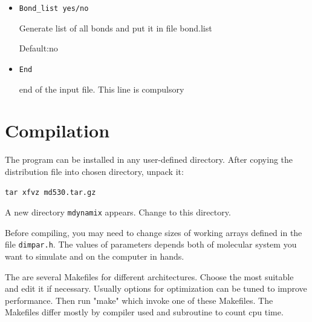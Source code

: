 \documentclass{article}
\begin{document}
\begin{itemize}
\verb|ascvel|  - ACSII (XMOL-type format) with coordinates and velocities

\verb|ascfor|  - ACSII (XMOL-type format) with coordinates and forces (in kJ/mol/\AA )

\verb|ascfvl|  - ACSII (XMOL-format) with coordinates, velocities and forces

\verb|<step>| is time interval (in femtoseconds) between the configurations 
saved in the trajectory file

\verb|<num_conf>| - number of configurations in each trajectory file. 
After filling \verb|<num_conf>| configuration in a trajectory file, 
the program begins to write configurations in the next file. 
Trajectory files acquire extensions .001, .002, .003, etc   

\verb|<list>| - list (in the form of numbers 0 or 1 for each molecule type) 
which signals whether to include molecules of this type into trajectory.
\verb|<list>| may be set also to ``all'' (all molecules)   

Units for velocities in the trajectory file are \AA/fs.

\item
\verb|Bond_list yes/no|

Generate list of all bonds and put it in file bond.list

Default:no

\item
\verb|End|    

end of the input file. This line is compulsory

\end{itemize}


\section{Compilation}

The program can be installed in any user-defined directory. After
copying the distribution file into chosen directory, unpack it:

\verb|tar xfvz md530.tar.gz|

A new directory \verb|mdynamix| appears. Change to this directory.

Before compiling, you may need to change sizes of working arrays defined
in the file \verb|dimpar.h|. The values of parameters depends both
of molecular system you want to simulate and on the computer in hands.

The are several Makefiles for different architectures. Choose the most
suitable and edit it if necessary. Usually options for optimization
can be tuned to improve performance. Then run "make" which invoke one of 
these Makefiles. The Makefiles differ mostly by compiler used and 
subroutine to count cpu time.
\end{document}

